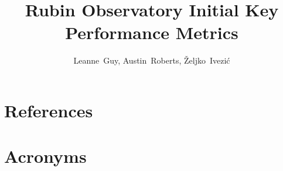 \documentclass[DM,authoryear,toc]{lsstdoc}
\title{Rubin Observatory Initial Key Performance Metrics}
\author{%
Leanne~Guy, Austin~Roberts, \v{Z}eljko~Ivezi\'c
}
\date{\vcsDate}
\begin{document}
\maketitle


\appendix
\section{References} \label{sec:bib}
\renewcommand{\refname}{} %


\section{Acronyms} \label{sec:acronyms}

\end{document}
